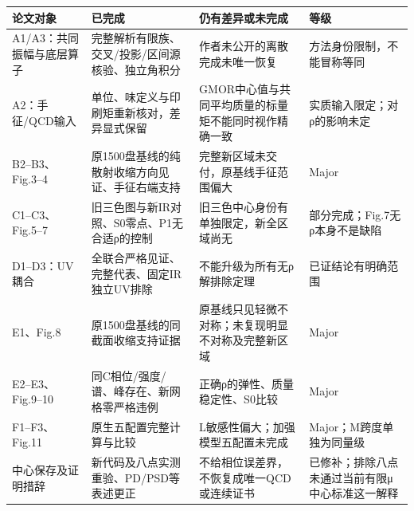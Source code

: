 \documentclass[
  10pt,
  a4paper,
]{article}
\newcounter{none} %
\begin{document}
{\def\LTcaptype{none} %
\begin{longtable}[]{@{}
  >{\raggedright\arraybackslash}p{}
  >{\raggedright\arraybackslash}p{}
  >{\raggedright\arraybackslash}p{}
  >{\raggedright\arraybackslash}p{}@{}}
\toprule\noalign{}
\begin{minipage}[b]{\linewidth}\raggedright
论文对象
\end{minipage} & \begin{minipage}[b]{\linewidth}\raggedright
已完成
\end{minipage} & \begin{minipage}[b]{\linewidth}\raggedright
仍有差异或未完成
\end{minipage} & \begin{minipage}[b]{\linewidth}\raggedright
等级
\end{minipage} \\
\midrule\noalign{}
\endhead
\bottomrule\noalign{}
\endlastfoot
A1/A3：共同振幅与底层算子 &
完整解析有限族、交叉/投影/区间源核验、独立角积分 &
作者未公开的离散完成未唯一恢复 & 方法身份限制，不能冒称等同 \\
A2：手征/QCD输入 & 单位、味定义与印刷矩重新核对，差异显式保留 &
GMOR中心值与共同平均质量的标量矩不能同时视作精确一致 &
实质输入限定；对ρ的影响未定 \\
B2--B3、Fig.3--4 & 原1500盘基线的纯散射收缩方向见证、手征右端支持 &
完整新区域未交付，原基线手征范围偏大 & Major \\
C1--C3、Fig.5--7 & 旧三色图与新IR对照、S0零点、P1无合适ρ的控制 &
旧三色中心身份有单独限定，新全区域尚无 &
部分完成；Fig.7无ρ本身不是缺陷 \\
D1--D3：UV耦合 & 全联合严格见证、完整代表、固定IR独立UV排除 &
不能升级为所有无ρ解排除定理 & 已证结论有明确范围 \\
E1、Fig.8 & 原1500盘基线的同截面收缩支持证据 &
原基线只见轻微不对称；未复现明显不对称及完整新区域 & Major \\
E2--E3、Fig.9--10 & 同C相位/强度/谱、峰存在、新网格零严格违例 &
正确ρ的弹性、质量稳定性、S0比较 & Major \\
F1--F3、Fig.11 & 原生五配置完整计算与比较 &
L敏感性偏大；加强模型五配置未完成 & Major；M跨度单独为同量级 \\
中心保存及证明措辞 & 新代码及八点实测重验、PD/PSD等表述更正 &
不给相位误差界，不恢复成唯一QCD或连续证书 &
已修补；排除八点未通过当前有限μ中心标准这一解释 \\
\end{longtable}
}
\end{document}
